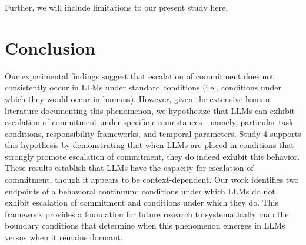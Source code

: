 \documentclass[letterpaper]{article} %
\begin{document}
Further, we will include limitations to our present study here.



\section{Conclusion}

Our experimental findings suggest that escalation of commitment does not consistently occur in LLMs under standard conditions (i.e., conditions under which they would occur in humans). However, given the extensive human literature documenting this phenomenon, we hypothesize that LLMs can exhibit escalation of commitment under specific circumstances---namely, particular task conditions, responsibility frameworks, and temporal parameters. Study 4 supports this hypothesis by demonstrating that when LLMs are placed in conditions that strongly promote escalation of commitment, they do indeed exhibit this behavior.
These results establish that LLMs have the capacity for escalation of commitment, though it appears to be context-dependent. Our work identifies two endpoints of a behavioral continuum: conditions under which LLMs do not exhibit escalation of commitment and conditions under which they do. This framework provides a foundation for future research to systematically map the boundary conditions that determine when this phenomenon emerges in LLMs versus when it remains dormant.


\newpage



% 
\end{document}
